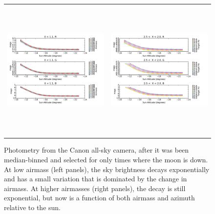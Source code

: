 \documentclass[]{spie}
\begin{document}
\begin{figure}[ht]
  \begin{center}
  \begin{tabular}{c c}
  \includegraphics[height=7cm]{plots/altDecay.pdf} & \includegraphics[height=7cm]{plots/altDecayHA.pdf}
  \end{tabular}
  \end{center}
  \caption{Photometry from the Canon all-sky camera, after it was been median-binned and selected for only times where the moon is down.  At low airmass (left panels), the sky brightness decays exponentially and has a small variation that is dominated by the change in airmass.  At higher airmasses (right panels), the decay is still exponential, but now is a function of both airmass and azimuth relative to the sun. \label{fig:twiExp}}
\end{figure}
\end{document}

